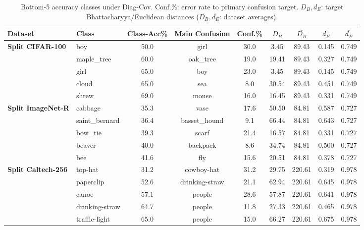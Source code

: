 \begin{table}[htbp]
	\centering
	\small
	\caption{Bottom-5 accuracy classes under Diag-Cov. $\text{Conf.}\%$: error rate to primary confusion target. $D_B, d_E$: target Bhattacharyya/Euclidean distances ($\overline{D_B}, \overline{d_E}$: dataset averages).}
	\label{tab:worst_diag}
	\begin{adjustbox}{width=0.95\columnwidth, center}
		\small
		\begin{tabular}{llccccccc}
			\toprule
			\textbf{Dataset} & \textbf{Class} & \textbf{Class-Acc\%} & \textbf{Main Confusion} & \textbf{Conf.\%} & $D_B$ & $\overline{D_B}$ & $d_E$ & $\overline{d_E}$ \\
			\midrule
			\textbf{Split CIFAR-100}
			& boy           & 50.0 & girl        & 30.0 &    3.45 & 89.43 & 0.145 & 0.749 \\
			& maple\_tree   & 60.0 & oak\_tree   & 19.0 & 19.41 & 89.43 & 0.327 & 0.749 \\
			& girl          & 65.0 & boy         & 23.0 &    3.45 & 89.43 & 0.145 & 0.749 \\
			& cloud         & 65.0 & sea         &   8.0 & 30.54 & 89.43 & 0.451 & 0.749 \\
			& shrew         & 69.0 & mouse       & 16.0 & 16.45 & 89.43 & 0.331 & 0.749 \\
			\midrule
			\textbf{Split ImageNet-R}
			& cabbage       & 35.3 & vase        & 17.6 & 50.50 & 84.81 & 0.587 & 0.727 \\
			& saint\_bernard & 36.4 & basset\_hound &   9.1 & 66.44 & 84.81 & 0.643 & 0.727 \\
			& bow\_tie      & 39.3 & scarf       & 21.4 & 16.57 & 84.81 & 0.331 & 0.727 \\
			& beaver        & 40.0 & backpack    &   8.6 & 34.74 & 84.81 & 0.500 & 0.727 \\
			& bee           & 41.6 & fly         & 15.6 & 20.51 & 84.81 & 0.378 & 0.727 \\
			\midrule
			\textbf{Split Caltech-256}
			& top-hat       & 31.2 & cowboy-hat  & 31.2 & 29.75 & 220.61 & 0.319 & 0.978 \\
			& paperclip     & 52.6 & drinking-straw & 21.1 & 62.94 & 220.61 & 0.645 & 0.978 \\
			& canoe         & 57.1 & people      & 28.6 & 57.87 & 220.61 & 0.641 & 0.978 \\
			& drinking-straw & 64.7 & people     & 11.8 & 27.33 & 220.61 & 0.465 & 0.978 \\
			& traffic-light & 65.0 & people      & 15.0 & 66.27 & 220.61 & 0.675 & 0.978 \\
			\bottomrule
		\end{tabular}
	\end{adjustbox}
\end{table}

